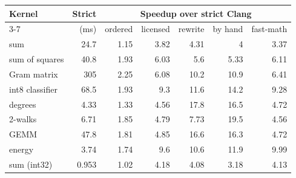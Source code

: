 \begin{tabular}{lrrrrrr}
\toprule
Kernel & Strict & \multicolumn{5}{c}{Speedup over strict Clang}\\
\cmidrule(lr){3-7}
 & (ms) & ordered & licensed & rewrite & by hand & fast-math\\
\midrule
sum & 24.7 & 1.15 & 3.82 & 4.31 & 4 & 3.37\\
sum of squares & 40.8 & 1.93 & 6.03 & 5.6 & 5.33 & 6.11\\
Gram matrix & 305 & 2.25 & 6.08 & 10.2 & 10.9 & 6.41\\
int8 classifier & 68.5 & 1.93 & 9.3 & 11.6 & 14.2 & 9.28\\
degrees & 4.33 & 1.33 & 4.56 & 17.8 & 16.5 & 4.72\\
2-walks & 6.71 & 1.85 & 4.79 & 7.73 & 19.5 & 4.56\\
GEMM & 47.8 & 1.81 & 4.85 & 16.6 & 16.3 & 4.72\\
energy & 3.74 & 1.74 & 9.6 & 10.6 & 11.9 & 9.99\\
sum (int32) & 0.953 & 1.02 & 4.18 & 4.08 & 3.18 & 4.13\\
\bottomrule
\end{tabular}
